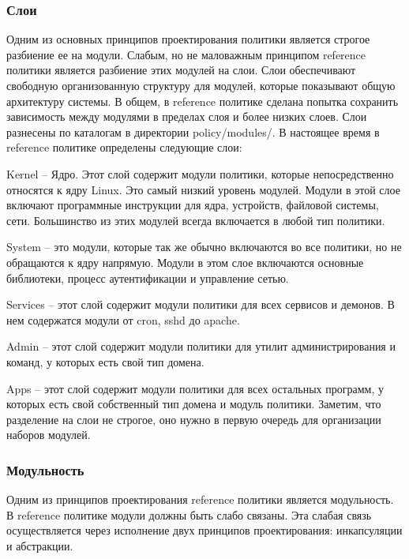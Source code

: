 \documentclass{./../class/UIR}
\begin{document}
\subsubsection{Слои}
    Одним из основных принципов проектирования политики является строгое разбиение
	ее на модули. Слабым, но не маловажным принципом reference политики является
	разбиение этих модулей на слои. Слои обеспечивают свободную организованную
	структуру для модулей, которые показывают общую архитектуру системы.
	В общем,  в reference политике сделана попытка сохранить зависимость между
	модулями в пределах слоя и более низких слоев. Слои разнесены по каталогам в
	директории policy/modules/. В настоящее время в reference политике определены
	следующие слои:
	\begin{description}
	  \item Kernel – Ядро. Этот слой содержит модули политики, которые
	  непосредственно относятся к ядру Linux. Это самый низкий уровень модулей. Модули
	  в этой слое включают программные инструкции для ядра, устройств, файловой системы,
	  сети. Большинство из этих модулей всегда включается в любой тип политики.
	  \item System – это модули, которые так же обычно включаются во все политики, но
	  не обращаются к ядру напрямую. Модули в этом слое включаются основные
	  библиотеки, процесс аутентификации и управление сетью.
	  \item Services – этот слой содержит модули политики для всех сервисов и
	  демонов.
	  В нем содержатся модули от cron, sshd  до apache.
	  \item Admin – этот слой содержит модули политики для утилит администрирования и
	  команд, у которых есть свой тип домена.
	  \item Apps – этот слой содержит модули политики для всех остальных программ, у
	  которых есть свой собственный тип домена и модуль политики.
	  Заметим, что разделение на слои не строгое, оно нужно в первую очередь для
	  организации наборов модулей.
	\end{description}
	
\subsubsection{Модульность}
	
	Одним из принципов проектирования reference политики является
	модульность. В reference политике модули должны быть слабо связаны. Эта слабая
	связь осуществляется через исполнение двух принципов проектирования:
	инкапсуляции и абстракции.
	
\end{document}
